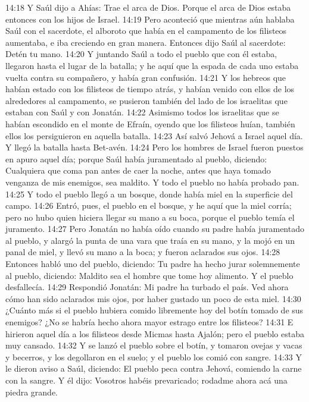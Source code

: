 14:18 Y Saúl dijo a Ahías: Trae el arca de Dios. Porque el arca de Dios estaba entonces con los hijos de Israel.  
14:19 Pero aconteció que mientras aún hablaba Saúl con el sacerdote, el alboroto que había en el campamento de los filisteos aumentaba, e iba creciendo en gran manera. Entonces dijo Saúl al sacerdote: Detén tu mano.  
14:20 Y juntando Saúl a todo el pueblo que con él estaba, llegaron hasta el lugar de la batalla; y he aquí que la espada de cada uno estaba vuelta contra su compañero, y había gran confusión.  
14:21 Y los hebreos que habían estado con los filisteos de tiempo atrás, y habían venido con ellos de los alrededores al campamento, se pusieron también del lado de los israelitas que estaban con Saúl y con Jonatán.  
14:22 Asimismo todos los israelitas que se habían escondido en el monte de Efraín, oyendo que los filisteos huían, también ellos los persiguieron en aquella batalla.  
14:23 Así salvó Jehová a Israel aquel día. Y llegó la batalla hasta Bet-avén.  
14:24 Pero los hombres de Israel fueron puestos en apuro aquel día; porque Saúl había juramentado al pueblo, diciendo: Cualquiera que coma pan antes de caer la noche, antes que haya tomado venganza de mis enemigos, sea maldito. Y todo el pueblo no había probado pan.  
14:25 Y todo el pueblo llegó a un bosque, donde había miel en la superficie del campo.  
14:26 Entró, pues, el pueblo en el bosque, y he aquí que la miel corría; pero no hubo quien hiciera llegar su mano a su boca, porque el pueblo temía el juramento.  
14:27 Pero Jonatán no había oído cuando su padre había juramentado al pueblo, y alargó la punta de una vara que traía en su mano, y la mojó en un panal de miel, y llevó su mano a la boca; y fueron aclarados sus ojos.  
14:28 Entonces habló uno del pueblo, diciendo: Tu padre ha hecho jurar solemnemente al pueblo, diciendo: Maldito sea el hombre que tome hoy alimento. Y el pueblo desfallecía.  
14:29 Respondió Jonatán: Mi padre ha turbado el país. Ved ahora cómo han sido aclarados mis ojos, por haber gustado un poco de esta miel.  
14:30 ¿Cuánto más si el pueblo hubiera comido libremente hoy del botín tomado de sus enemigos? ¿No se habría hecho ahora mayor estrago entre los filisteos? 
14:31 E hirieron aquel día a los filisteos desde Micmas hasta Ajalón; pero el pueblo estaba muy cansado.  
14:32 Y se lanzó el pueblo sobre el botín, y tomaron ovejas y vacas y becerros, y los degollaron en el suelo; y el pueblo los comió con sangre.  
14:33 Y le dieron aviso a Saúl, diciendo: El pueblo peca contra Jehová, comiendo la carne con la sangre. Y él dijo: Vosotros habéis prevaricado; rodadme ahora acá una piedra grande.  
